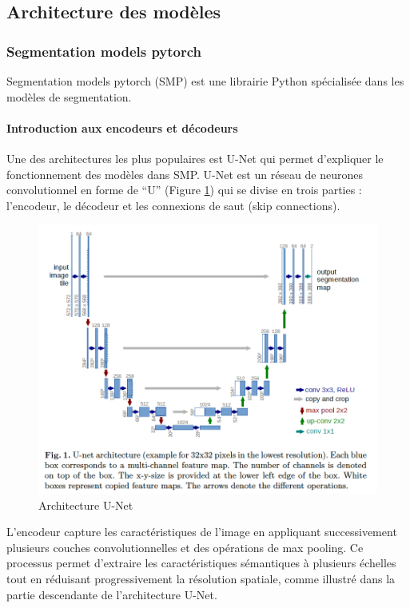 \subsection{Architecture des modèles} %
\subsubsection{Segmentation models pytorch}
Segmentation models pytorch (SMP) \cite{noauthor_welcome_nodate} est une librairie Python spécialisée dans les modèles de segmentation.
\paragraph{Introduction aux encodeurs et décodeurs}
Une des architectures les plus populaires est U-Net \cite{ronneberger_u-net_2015} qui permet d'expliquer le fonctionnement des modèles dans SMP. U-Net est un réseau de neurones convolutionnel en forme de ``U'' (Figure \ref{fig:ch36_architecture_01_architecture_unet}) qui se divise en trois parties : l'encodeur, le décodeur et les connexions de saut (skip connections).

\begin{figure}[H]
    \centering
    \includegraphics[width=1\linewidth]{02-main//figures//ch3/ch36_architecture_01_architecture_unet.png}
    \caption{Architecture U-Net \cite{ronneberger_u-net_2015}}
    \label{fig:ch36_architecture_01_architecture_unet}
\end{figure}

L'encodeur capture les caractéristiques de l'image en appliquant successivement plusieurs couches convolutionnelles et des opérations de max pooling. Ce processus permet d'extraire les caractéristiques sémantiques à plusieurs échelles tout en réduisant progressivement la résolution spatiale, comme illustré dans la partie descendante de l'architecture U-Net.

